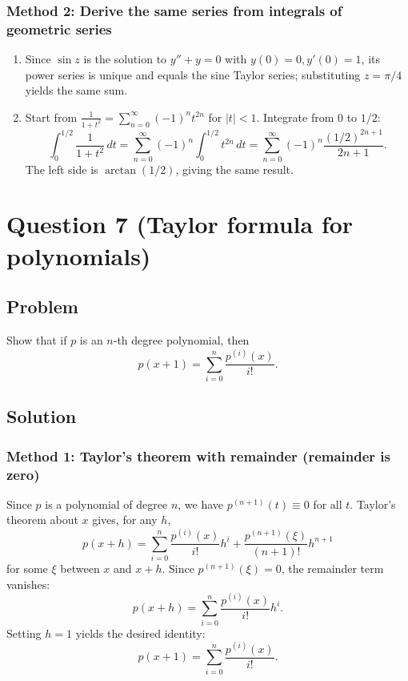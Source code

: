 \documentclass[12pt]{article}
\begin{document}
\subsubsection*{Method 2: Derive the same series from integrals of geometric series}
\begin{enumerate}[label=(\alph*)]
\item Since \(\sin z\) is the solution to \(y''+y=0\) with \(y(0)=0,y'(0)=1\), its power series is unique and equals the sine Taylor series; substituting \(z=\pi/4\) yields the same sum.

\item Start from \(\frac{1}{1+t^2}=\sum_{n=0}^\infty (-1)^n t^{2n}\) for \(|t|<1\). Integrate from \(0\) to \(1/2\):
\[
\int_0^{1/2}\frac{1}{1+t^2}\,dt=\sum_{n=0}^\infty (-1)^n\int_0^{1/2} t^{2n}\,dt
=\sum_{n=0}^\infty (-1)^n\frac{(1/2)^{2n+1}}{2n+1}.
\]
The left side is \(\arctan(1/2)\), giving the same result.
\end{enumerate}

\newpage
\section*{Question 7 (Taylor formula for polynomials)}
\subsection*{Problem}
Show that if \(p\) is an \(n\)-th degree polynomial, then
\[
p(x+1)=\sum_{i=0}^{n}\frac{p^{(i)}(x)}{i!}.
\]

\subsection*{Solution}

\subsubsection*{Method 1: Taylor's theorem with remainder (remainder is zero)}
Since \(p\) is a polynomial of degree \(n\), we have \(p^{(n+1)}(t)\equiv 0\) for all \(t\).
Taylor's theorem about \(x\) gives, for any \(h\),
\[
p(x+h)=\sum_{i=0}^{n}\frac{p^{(i)}(x)}{i!}h^i+\frac{p^{(n+1)}(\xi)}{(n+1)!}h^{n+1}
\]
for some \(\xi\) between \(x\) and \(x+h\). Since \(p^{(n+1)}(\xi)=0\), the remainder term vanishes:
\[
p(x+h)=\sum_{i=0}^{n}\frac{p^{(i)}(x)}{i!}h^i.
\]
Setting \(h=1\) yields the desired identity:
\[
\boxed{p(x+1)=\sum_{i=0}^{n}\frac{p^{(i)}(x)}{i!}.}
\]
\end{document}
